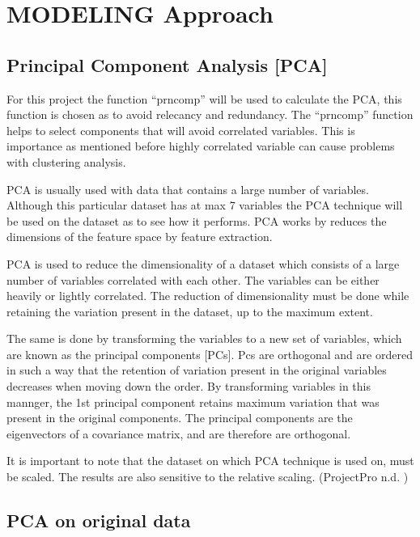 \documentclass[
]{article}
\begin{document}
\newpage

\hypertarget{modeling-approach}{%
\section{MODELING Approach}\label{modeling-approach}}

\hypertarget{principal-component-analysis-pca}{%
\subsection{Principal Component Analysis
{[}PCA{]}}\label{principal-component-analysis-pca}}

For this project the function ``prncomp'' will be used to calculate the
PCA, this function is chosen as to avoid relecancy and redundancy. The
``prncomp'' function helps to select components that will avoid
correlated variables. This is importance as mentioned before highly
correlated variable can cause problems with clustering analysis.

PCA is usually used with data that contains a large number of variables.
Although this particular dataset has at max 7 variables the PCA
technique will be used on the dataset as to see how it performs. PCA
works by reduces the dimensions of the feature space by feature
extraction.

PCA is used to reduce the dimensionality of a dataset which consists of
a large number of variables correlated with each other. The variables
can be either heavily or lightly correlated. The reduction of
dimensionality must be done while retaining the variation present in the
dataset, up to the maximum extent.

The same is done by transforming the variables to a new set of
variables, which are known as the principal components {[}PCs{]}. Pcs
are orthogonal and are ordered in such a way that the retention of
variation present in the original variables decreases when moving down
the order. By transforming variables in this mannger, the 1st principal
component retains maximum variation that was present in the original
components. The principal components are the eigenvectors of a
covariance matrix, and are therefore are orthogonal.

It is important to note that the dataset on which PCA technique is used
on, must be scaled. The results are also sensitive to the relative
scaling. (ProjectPro n.d. )

\hypertarget{pca-on-original-data}{%
\subsection{PCA on original data}\label{pca-on-original-data}}
\end{document}
